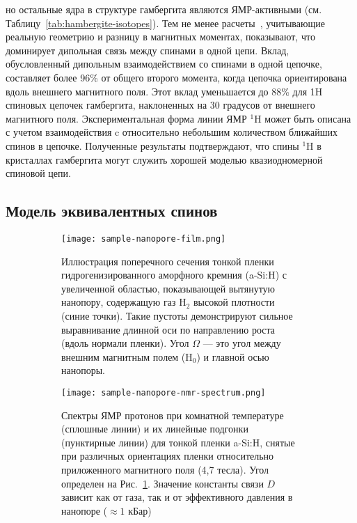 но остальные ядра в структуре гамбергита являются ЯМР-активными (см. Таблицу~\ref{tab:hambergite-isotopes}).
Тем не менее расчеты~\cite{Bochkin2020jmr},
учитывающие реальную геометрию и разницу в магнитных моментах,
показывают, что доминирует дипольная связь между спинами в одной цепи.
Вклад, обусловленный дипольным взаимодействием со спинами в одной цепочке, составляет более 96\% от общего второго момента,
когда цепочка ориентирована вдоль внешнего магнитного поля.
Этот вклад уменьшается до 88\% для 1H спиновых цепочек гамбергита,
наклоненных на 30 градусов от внешнего магнитного поля.
Экспериментальная форма линии ЯМР $^1$H может быть описана
с учетом взаимодействия c относительно небольшим количеством ближайших спинов в цепочке.
Полученные результаты подтверждают,
что спины $^1$H в кристаллах гамбергита могут служить хорошей моделью квазиодномерной спиновой цепи.





\subsection{Модель эквивалентных спинов}
\begin{figure}[H]
  \begin{subfigure}[t]{0.55\textwidth}
    \centering
    \texttt{[image: sample-nanopore-film.png]}
    \caption{
      Иллюстрация поперечного сечения тонкой пленки гидрогенизированного аморфного кремния (a-Si:H) с увеличенной областью,
      показывающей вытянутую нанопору,
      содержащую газ H$_2$ высокой плотности (синие точки).
      Такие пустоты демонстрируют сильное выравнивание длинной оси по направлению роста (вдоль нормали пленки).
      Угол $\Omega$ --- это угол между внешним магнитным полем (H$_0$) и главной осью нанопоры.
    }
    \label{fig:sample-nanopore-film}
  \end{subfigure}
  \hfill
  \begin{subfigure}[t]{0.4\textwidth}
    \centering
    \texttt{[image: sample-nanopore-nmr-spectrum.png]}
    \caption{
      Спектры ЯМР протонов при комнатной температуре (сплошные линии)
      и их линейные подгонки (пунктирные линии)
      для тонкой пленки a-Si:H,
      снятые при различных ориентациях пленки относительно приложенного магнитного поля (4,7 тесла).
      Угол определен на  Рис.~\ref{fig:sample-nanopore-film}.
      Значение константы связи $D$ зависит как от газа,
      так и от эффективного давления в нанопоре ($\approx 1$ кБар)
    }
    \label{fig:sample-nanopore-nmr-spectrum}
  \end{subfigure}
  \caption{}
\end{figure}


